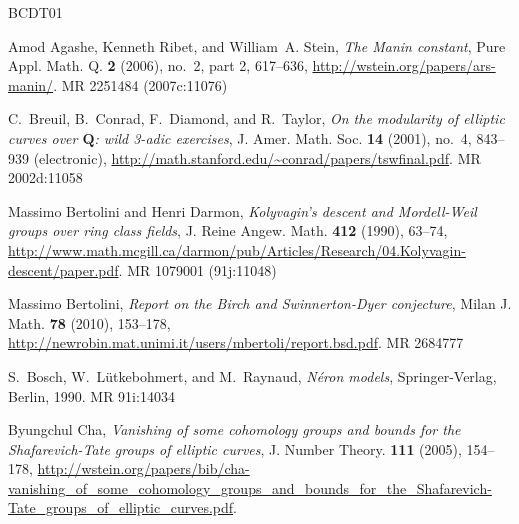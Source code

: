 \documentclass[preprint,12pt]{elsarticle}
\theoremstyle{plain}
\theoremstyle{definition}
\begin{document}

\newcommand{\etalchar}[1]{$^{#1}$}
\providecommand{\bysame}{\leavevmode\hbox to3em{\hrulefill}\thinspace}
\providecommand{\MR}{\relax\ifhmode\unskip\space\fi MR }
\providecommand{\MRhref}[2]{%
  \href{http://www.ams.org/mathscinet-getitem?mr=#1}{#2}
}
\providecommand{\href}[2]{#2}
\begin{thebibliography}{BCDT01}

Amod Agashe, Kenneth Ribet, and William~A. Stein, \emph{The {M}anin constant},
  Pure Appl. Math. Q. \textbf{2} (2006), no.~2, part 2, 617--636,
  \url{http://wstein.org/papers/ars-manin/}. \MR{2251484 (2007c:11076)}

C.~Breuil, B.~Conrad, F.~Diamond, and R.~Taylor, \emph{On the modularity of
  elliptic curves over {$\mathbf{Q}$}: wild 3-adic exercises}, J. Amer. Math.
  Soc. \textbf{14} (2001), no.~4, 843--939 (electronic),
  \url{http://math.stanford.edu/~conrad/papers/tswfinal.pdf}. \MR{2002d:11058}

Massimo Bertolini and Henri Darmon, \emph{Kolyvagin's descent and
  {M}ordell-{W}eil groups over ring class fields}, J. Reine Angew. Math.
  \textbf{412} (1990), 63--74,
  \url{http://www.math.mcgill.ca/darmon/pub/Articles/Research/04.Kolyvagin-descent/paper.pdf}.
  \MR{1079001 (91j:11048)}

Massimo Bertolini, \emph{Report on the {B}irch and {S}winnerton-{D}yer
  conjecture}, Milan J. Math. \textbf{78} (2010), 153--178,
  \url{http://newrobin.mat.unimi.it/users/mbertoli/report.bsd.pdf}.
  \MR{2684777}

S.~Bosch, W.~L{\"u}tkebohmert, and M.~Raynaud, \emph{N\'eron models},
  Springer-Verlag, Berlin, 1990. \MR{91i:14034}

Byungchul Cha, \emph{Vanishing of some cohomology groups and bounds for the
  {S}hafarevich-{T}ate groups of elliptic curves}, J. Number Theory.
  \textbf{111} (2005), 154--178,
  \url{http://wstein.org/papers/bib/cha-vanishing_of_some_cohomology_groups_and_bounds_for_the_Shafarevich-Tate_groups_of_elliptic_curves.pdf}.


\end{thebibliography}
\end{document}
